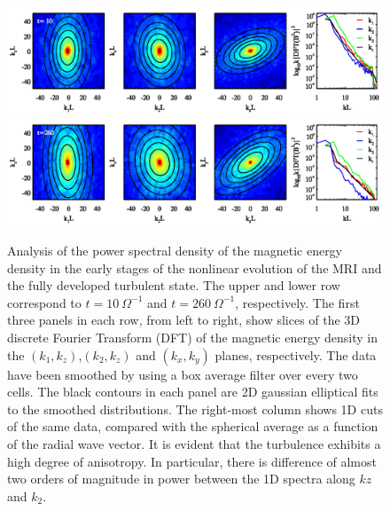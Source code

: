 \documentclass[]{emulateapj}
\begin{document}
\begin{figure}[t]
\begin{center}
\includegraphics[width= \textwidth]{f14.png}
\includegraphics[width= \textwidth]{f15.png}
\caption{
Analysis of the power spectral density of the magnetic energy density in the 
early stages of the nonlinear evolution of the MRI and the fully developed 
turbulent state. The upper and lower row correspond to $t=10~\Omega^{-1}$  
and $t=260~\Omega^{-1}$, respectively.
The first three panels in each row, from left to right, show slices of the 3D discrete 
Fourier Transform (DFT) of the magnetic energy density in the $(k_1,k_z)$,$(k_2,k_z)$ 
and $(k_x,k_y)$ planes, respectively. The data have been smoothed by using a box average filter over every two cells. The black contours in each panel are 2D gaussian elliptical fits to the 
smoothed distributions. The right-most column shows 1D cuts of the same data, compared with the spherical average as a function of the radial wave vector. 
It is evident that the turbulence exhibits a high degree of anisotropy. In particular, there is 
difference of almost two orders of magnitude in power between the 1D spectra along $kz$ and $k_2$.
}
\label{cutsof3dfft}
\end{center}
\end{figure}
\end{document}
